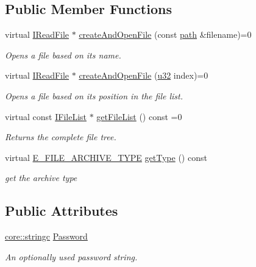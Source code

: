 \subsection*{Public Member Functions}
\begin{DoxyCompactItemize}
\item 
virtual \hyperlink{classirr_1_1io_1_1IReadFile}{I\+Read\+File} $\ast$ \hyperlink{classirr_1_1io_1_1IFileArchive_a5c3b4994ae63447d2634dd86b3069988}{create\+And\+Open\+File} (const \hyperlink{namespaceirr_1_1io_ab1bdc45edb3f94d8319c02bc0f840ee1}{path} \&filename)=0
\begin{DoxyCompactList}\small\item\em Opens a file based on its name. \end{DoxyCompactList}\item 
virtual \hyperlink{classirr_1_1io_1_1IReadFile}{I\+Read\+File} $\ast$ \hyperlink{classirr_1_1io_1_1IFileArchive_ab6bc8fbd660bbbe42b4d30a9d4f26c7d}{create\+And\+Open\+File} (\hyperlink{namespaceirr_a0416a53257075833e7002efd0a18e804}{u32} index)=0
\begin{DoxyCompactList}\small\item\em Opens a file based on its position in the file list. \end{DoxyCompactList}\item 
virtual const \hyperlink{classirr_1_1io_1_1IFileList}{I\+File\+List} $\ast$ \hyperlink{classirr_1_1io_1_1IFileArchive_a73c683318837b13d16843373da00ded3}{get\+File\+List} () const =0
\begin{DoxyCompactList}\small\item\em Returns the complete file tree. \end{DoxyCompactList}\item 
\mbox{\label{classirr_1_1io_1_1IFileArchive_ae991b223b7f3b8b47916d82d842e3004}} 
virtual \hyperlink{namespaceirr_1_1io_adb3e3c445ec8e608ed1f0f93306da14f}{E\+\_\+\+F\+I\+L\+E\+\_\+\+A\+R\+C\+H\+I\+V\+E\+\_\+\+T\+Y\+PE} \hyperlink{classirr_1_1io_1_1IFileArchive_ae991b223b7f3b8b47916d82d842e3004}{get\+Type} () const
\begin{DoxyCompactList}\small\item\em get the archive type \end{DoxyCompactList}\end{DoxyCompactItemize}
\subsection*{Public Attributes}
\begin{DoxyCompactItemize}
\item 
\hyperlink{namespaceirr_1_1core_ade1071a878633f2f6d8a75c5d11fec19}{core\+::stringc} \hyperlink{classirr_1_1io_1_1IFileArchive_ae5b574864226b09c70518e163e59b6ba}{Password}
\begin{DoxyCompactList}\small\item\em An optionally used password string. \end{DoxyCompactList}\end{DoxyCompactItemize}
